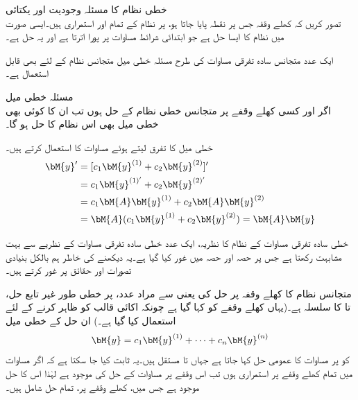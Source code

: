 \quad خطی نظام کا مسئلہ وجودیت اور یکتائی \\
تصور کریں کہ کھلے وقفہ  جس پر نقطہ  پایا جاتا ہو، پر  نظام  کے تمام  اور  استمراری ہیں۔ایسی صورت میں نظام  کا ایسا حل   ہے جو ابتدائی شرائط مساوات  پر پورا اترتا ہے  اور  یہ حل  ہے۔

ایک عدد متجانس سادہ تفرقی مساوات کی طرح  مسئلہ خطی میل متجانس نظام کے لئے بھی قابل استعمال ہے۔ 

\quad مسئلہ خطی میل\\
اگر  اور  کسی کھلے وقفے پر متجانس خطی نظام  کے حل ہوں تب ان کا کوئی بھی خطی میل   بھی اس نظام کا حل ہو گا۔ 

خطی میل  کا تفرق لیتے ہوئے مساوات  کا استعمال کرتے ہیں۔
\begin{align*}
\bM{y}'&=[c_1\bM{y}^{(1)}+c_2\bM{y}^{(2)}]'\\
&=c_1\bM{y}^{(1)'}+c_2\bM{y}^{(2)'}\\
&=c_1\bM{A}\bM{y}^{(1)}+c_2\bM{A}\bM{y}^{(2)}\\
&=\bM{A}(c_1\bM{y}^{(1)}+c_2\bM{y}^{(2)})=\bM{A}\bM{y}
\end{align*}

خطی سادہ تفرقی مساوات کے نظام کا نظریہ، ایک عدد خطی سادہ تفرقی مساوات کے نظریے سے بہت مشابہت رکھتا ہے جس پر حصہ  اور حصہ  میں غور کیا گیا ہے۔یہ دیکھنے کی خاطر ہم بالکل بنیادی تصورات اور حقائق پر غور کرتے ہیں۔ 

متجانس نظام  کا کھلے وقفہ  پر حل کی  یعنی  سے مراد  عدد،  پر خطی طور غیر تابع حل،  تا  کا سلسلہ ہے۔(یہاں کھلے وقفے کو  کہا گیا ہے چونکہ  اکائی قالب کو ظاہر کرنے کے لئے استعمال کیا گیا ہے۔) ان حل کے خطی میل
\begin{align}\label{مساوات_نظام_ورونسکی_الف}
\bM{y}=c_1\bM{y}^{(1)}+\cdots+c_n\bM{y}^{(n)}
\end{align}
کو  پر مساوات  کا عمومی حل کہا جاتا ہے جہاں  تا   مستقل ہیں۔یہ ثابت کیا جا سکتا ہے کہ اگر مساوات  میں تمام  کھلے وقفے پر استمراری ہوں تب اس وقفے پر مساوات  کے حل کی  موجود ہے لہٰذا اس کا  حل موجود ہے جس میں، کھلے وقفے پر، تمام حل شامل ہیں۔

